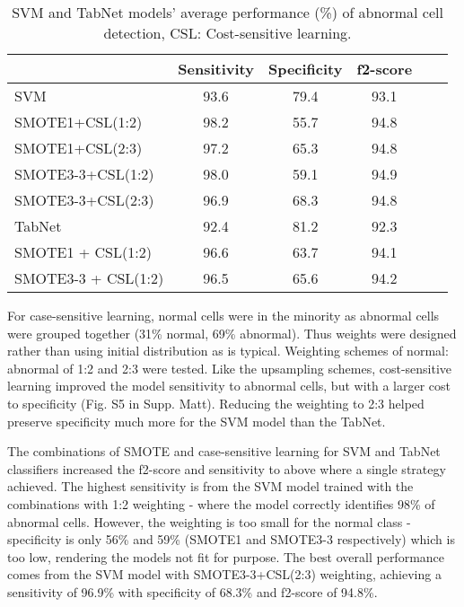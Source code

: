 \documentclass[final,5p,times,twocolumn,authoryear]{elsarticle}
\begin{document}
\begin{table}[t!]
\caption{SVM and TabNet models' average performance (\%) of abnormal cell detection, CSL: Cost-sensitive learning.}
\footnotesize
\centering
\begin{tabular}{@{}lccccc@{}} \toprule
    \centering
  &	Sensitivity &	Specificity &	f2-score \\ \midrule
SVM 	& 93.6	& 79.4	& 93.1 \\
{SMOTE1+CSL(1:2)} & 98.2 &	55.7 &	94.8 \\
{SMOTE1+CSL(2:3)}  &  97.2 &	65.3 &	94.8 \\
{SMOTE3-3+CSL(1:2)}  &  98.0 &	59.1 &	94.9 \\
{SMOTE3-3+CSL(2:3)}  &  96.9 &	68.3 &	94.8 \\ \midrule
TabNet 	& 92.4 &	81.2 &	92.3 \\ 
{SMOTE1 + CSL(1:2)} & 96.6 &	63.7 &	94.1 \\ 
{SMOTE3-3 + CSL(1:2)} & 96.5 &	65.6 &	94.2\\ 
\bottomrule
\end{tabular}
\label{table:res1}
\end{table}


For case-sensitive learning, normal cells were in the minority as abnormal cells were grouped together (31\% normal, 69\% abnormal). Thus weights were designed rather than using initial distribution as is typical. Weighting schemes of normal: abnormal of 1:2 and 2:3 were tested. 
Like the upsampling schemes, cost-sensitive learning improved the model sensitivity to abnormal cells, but with a larger cost to specificity (Fig. S5 in Supp. Matt). Reducing the weighting to 2:3 helped preserve specificity much more for the SVM model than the TabNet.

The combinations of SMOTE and case-sensitive learning for SVM and TabNet classifiers increased the f2-score and sensitivity to above where a single strategy achieved.
The highest sensitivity is from the SVM model trained with the combinations with 1:2 weighting - where the model correctly identifies 98\% of abnormal cells. However, the weighting is too small for the normal class - specificity is only 56\% and 59\% (SMOTE1 and SMOTE3-3 respectively) which is too low, rendering the models not fit for purpose. The best overall performance comes from the SVM model with SMOTE3-3+CSL(2:3) weighting, achieving a sensitivity of 96.9\% with specificity of 68.3\% and f2-score of 94.8\%.

\end{document}
